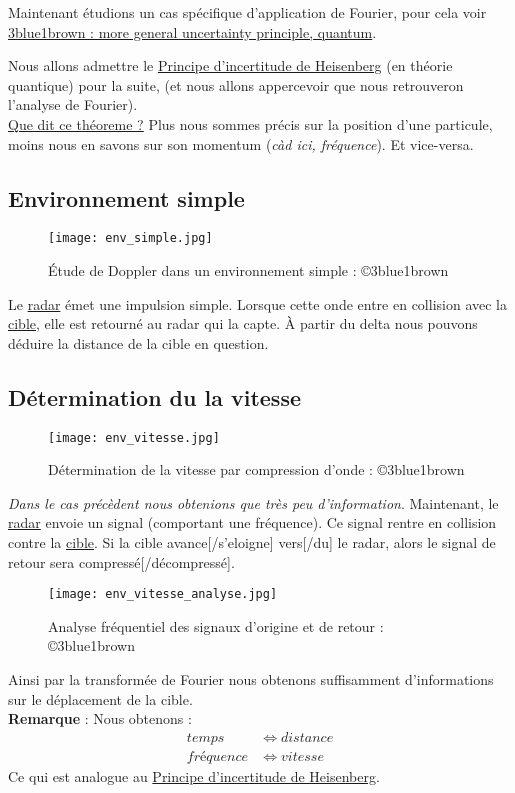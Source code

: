 \documentclass[a4paper]{book}
\begin{document}
Maintenant étudions un cas spécifique d'application de Fourier, pour cela voir
\href{https://www.youtube.com/watch?v=MBnnXbOM5S4}{3blue1brown : more general 
uncertainty principle, quantum}. \\ \break

Nous allons admettre le \underline{Principe d'incertitude de Heisenberg} (en
théorie quantique) pour la suite, (et nous allons appercevoir que nous 
retrouveron l'analyse de Fourier).\\
\underline{Que dit ce théoreme ?} Plus nous sommes précis sur la position d'une
particule, moins nous en savons sur son momentum (\emph{càd ici, fréquence}).
Et vice-versa.

\subsection{Environnement simple}
\begin{figure}[htb!]
	\centering
	\texttt{[image: env\_simple.jpg]}
	\caption{Étude de Doppler dans un environnement
	simple : ©3blue1brown }
\end{figure}
Le \underline{radar} émet une impulsion simple. Lorsque cette onde entre en
collision avec la \underline{cible}, elle est retourné au radar qui la capte. À
partir du delta nous pouvons déduire la distance de la cible en question.

\subsection{Détermination du la vitesse}
\begin{figure}[H]
	\centering
	\texttt{[image: env\_vitesse.jpg]}
	\caption{Détermination de la vitesse par compression d'onde
	: ©3blue1brown }
\end{figure}
\emph{Dans le cas précèdent nous obtenions que très peu d'information}.
Maintenant, le \underline{radar} envoie un signal (comportant une fréquence).
Ce signal rentre en collision contre la \underline{cible}. Si la cible
avance[/s'eloigne] vers[/du] le radar, alors le signal de retour sera 
compressé[/décompressé]. \\

\begin{figure}[H]
	\centering
	\texttt{[image: env\_vitesse\_analyse.jpg]}
	\caption{Analyse fréquentiel des signaux d'origine et de retour
	: ©3blue1brown }
\end{figure}
Ainsi par la transformée de Fourier nous obtenons suffisamment d'informations
sur le déplacement de la cible.\\
\textbf{Remarque} : Nous obtenons :
\begin{align*}
	temps &\Leftrightarrow distance \\
	fréquence &\Leftrightarrow vitesse 
\end{align*}
Ce qui est analogue au \underline{Principe d'incertitude de Heisenberg}. 
\end{document}
